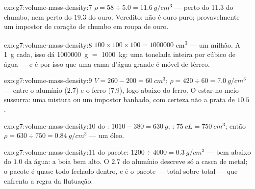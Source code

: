 \begin{solution}{exo:g7:volume-mass-density:7}
$\rho = 58 \div 5.0 = \qty{11.6}{g/cm^3}$ --- perto do $11.3$ do
chumbo, nem perto do $19.3$ do ouro. Veredito: não é ouro puro;
provavelmente um impostor de coração de chumbo em roupa de ouro.
\end{solution}

\begin{solution}{exo:g7:volume-mass-density:8}
$100 \times 100 \times 100 = 1000000$ \unit{cm^3} --- um milhão. A
\qty{1}{g} cada, isso dá \qty{1000000}{g} $=$ \qty{1000}{kg}: uma
tonelada inteira por  cúbico de água --- e é por isso que uma
cama d'água grande é móvel de térreo.
\end{solution}

\begin{solution}{exo:g7:volume-mass-density:9}
$V = 260 - 200 = \qty{60}{cm^3}$;
$\rho = 420 \div 60 = \qty{7.0}{g/cm^3}$ --- entre o alumínio
($2.7$) e o ferro ($7.9$), logo abaixo do ferro. O estar-no-meio
sussurra: uma mistura ou um impostor banhado, com certeza não a prata
de $10.5$.
\end{solution}

\begin{solution}{exo:g7:volume-mass-density:10}
 do : $1010 - 380 = \qty{630}{g}$; :
$\qty{75}{cL} = \qty{750}{cm^3}$; então
$\rho = 630 \div 750 = \qty{0.84}{g/cm^3}$ --- um óleo.
\end{solution}

\begin{solution}{exo:g7:volume-mass-density:11}
 do pacote: $1200 \div 4000 = \qty{0.3}{g/cm^3}$ --- bem
abaixo do $1.0$ da água: a boia  bem alto. O $2.7$ do alumínio
descreve só a casca de metal; o pacote é quase todo  fechado
dentro, e é o pacote ---  total sobre  total --- que
enfrenta a regra da flutuação.
\end{solution}


